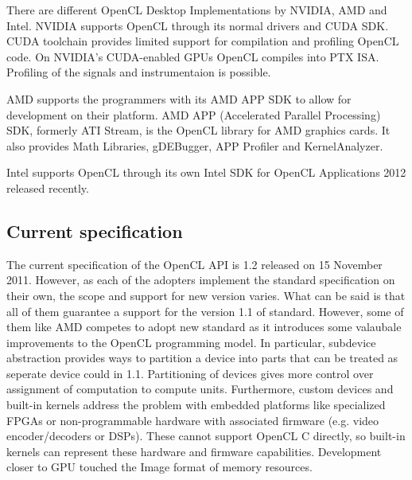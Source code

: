 There are different OpenCL Desktop Implementations by NVIDIA\cite{nvidia2012opencl}, AMD\citep{amd2012devzone} and Intel\cite{intel2012openclsdk}. NVIDIA supports OpenCL through its normal drivers and CUDA SDK. CUDA toolchain provides limited support for compilation and profiling OpenCL code. On NVIDIA's CUDA-enabled GPUs OpenCL compiles into PTX ISA. Profiling of the signals and instrumentaion is possible.

AMD supports the programmers with its AMD APP SDK to allow for development on their platform. AMD APP (Accelerated Parallel Processing) SDK, formerly ATI Stream, is the OpenCL library for AMD graphics cards. It also provides Math Libraries, gDEBugger, APP Profiler and KernelAnalyzer.

Intel supports OpenCL through its own Intel SDK for OpenCL Applications 2012 released recently. 

\subsection{Current specification}
The current specification of the OpenCL API is 1.2 released on 15 November 2011. However, as each of the adopters implement the standard specification on their own, the scope and support for new version varies. What can be said is that all of them guarantee a support for the version 1.1 of standard. However, some of them like AMD competes to adopt new standard as it introduces some valaubale improvements to the OpenCL programming model. In particular, subdevice abstraction provides ways to partition a device into parts that can be treated as seperate device could in 1.1. Partitioning of devices gives more control over assignment of computation to compute units. Furthermore, custom devices and built-in kernels address the problem with embedded platforms like specialized FPGAs or non-programmable hardware with associated firmware (e.g. video encoder/decoders or DSPs). These cannot support OpenCL C directly, so built-in kernels can represent these hardware and firmware capabilities. Development closer to GPU touched the Image format of memory resources.\cite{khronos2012cloverview, khronos2012release}

